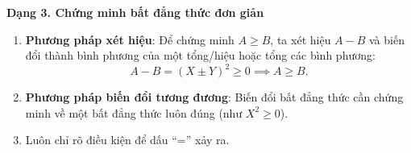 \textbf{Dạng 3. Chứng minh bất đẳng thức đơn giản}
\begin{enumerate}
\item \textbf{Phương pháp xét hiệu}: Để chứng minh $A \ge B$, ta xét hiệu $A - B$ và biến đổi thành bình phương của một tổng/hiệu hoặc tổng các bình phương:
$$A - B = (X \pm Y)^2 \ge 0 \implies A \ge B.$$
\item \textbf{Phương pháp biến đổi tương đương}: Biến đổi bất đẳng thức cần chứng minh về một bất đẳng thức luôn đúng (như $X^2 \ge 0$).
\item Luôn chỉ rõ điều kiện để dấu ``='' xảy ra.
\end{enumerate}
